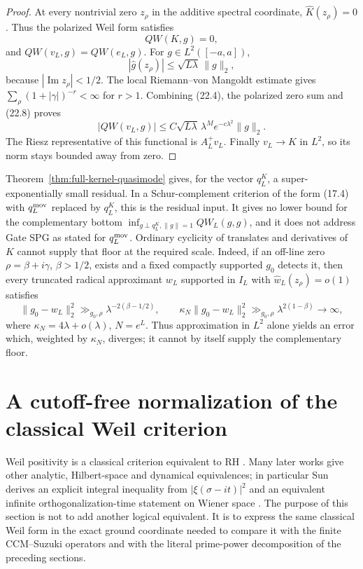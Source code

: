 \documentclass[11pt]{amsart}
\theoremstyle{definition}
\theoremstyle{remark}
\begin{document}
\begin{proof}
At every nontrivial zero \(z_\rho\) in the additive spectral coordinate,
\(\widehat K(z_\rho)=0\).  Thus the polarized Weil form satisfies
\[
 QW(K,g)=0,
\tag{22.7}
\]
and \(QW(v_L,g)=QW(e_L,g)\).  For \(g\in L^2([-a,a])\),
\[
 |\widehat g(z_\rho)|
 \le\sqrt{L\lambda}\,\|g\|_2,
\tag{22.8}
\]
because \(|\operatorname{Im}z_\rho|<1/2\).  The local
Riemann--von Mangoldt estimate gives
\(\sum_\rho(1+|\gamma|)^{-r}<\infty\) for \(r>1\).  Combining
(22.4), the polarized zero sum and (22.8) proves
\[
 |QW(v_L,g)|
 \le C\sqrt{L\lambda}\,\lambda^Me^{-c\lambda^2}\|g\|_2.
\]
The Riesz representative of this functional is \(A_L^+v_L\).  Finally
\(v_L\to K\) in \(L^2\), so its norm stays bounded away from zero.
\end{proof}

Theorem~\ref{thm:full-kernel-quasimode} gives, for the vector \(q_L^K\),
a super-exponentially small residual.  In a Schur-complement criterion of
the form (17.4) with \(q_L^{\rm mov}\) replaced by \(q_L^K\), this is the
residual input.  It gives no lower bound for the complementary bottom
\(\inf_{g\perp q_L^K,\|g\|=1}QW_L(g,g)\), and it does not address Gate
SPG as stated for \(q_L^{\rm mov}\).  Ordinary cyclicity of translates and derivatives of
\(K\) cannot supply that floor at the required scale.  Indeed, if an
off-line zero \(\rho=\beta+i\gamma\), \(\beta>1/2\), exists and a
fixed compactly supported \(g_0\) detects it, then every truncated radical
approximant \(w_L\) supported in \(I_L\) with
\(\widehat w_L(z_\rho)=o(1)\) satisfies
\[
 \|g_0-w_L\|_2^2\gg_{g_0,\rho}
 \lambda^{-2(\beta-1/2)},\qquad
 \kappa_N\|g_0-w_L\|_2^2
 \gg_{g_0,\rho}\lambda^{2(1-\beta)}\longrightarrow\infty,
\tag{22.9}
\]
where \(\kappa_N=4\lambda+o(\lambda)\), \(N=e^L\).  Thus approximation
in \(L^2\) alone yields an error which, weighted by \(\kappa_N\),
diverges; it cannot by itself supply the complementary floor.

\section{A cutoff-free normalization of the classical Weil criterion}
\label{sec:doob-variance}

Weil positivity is a classical criterion equivalent to RH
\cite{Weil1952}.  Many later works give other analytic, Hilbert-space and
dynamical equivalences; in particular Sun derives an explicit integral
inequality from \(|\xi(\sigma-it)|^2\) and an equivalent infinite
orthogonalization-time statement on Wiener space \cite{Sun}.  The purpose
of this section is not to add another logical equivalent.  It is to express
the same classical Weil form in the exact ground coordinate needed to
compare it with the finite CCM--Suzuki operators and with the literal
prime-power decomposition of the preceding sections.
\end{document}

